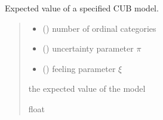 \documentclass[letterpaper,10pt,english]{sphinxmanual}
\begin{document}
\begin{fulllineitems}
\label{\detokenize{cubmods:cubmods.cub.mean}}
\pysigstartsignatures
{}
\pysigstopsignatures
\sphinxAtStartPar
Expected value of a specified CUB model.
\begin{quote}\begin{description}
\begin{itemize}
\item {} 
\sphinxAtStartPar
{} () \textendash{} number of ordinal categories

\item {} 
\sphinxAtStartPar
{} () \textendash{} uncertainty parameter \(\pi\)

\item {} 
\sphinxAtStartPar
{} () \textendash{} feeling parameter \(\xi\)

\end{itemize}

\sphinxAtStartPar
the expected value of the model

\sphinxAtStartPar
float

\end{description}\end{quote}

\end{fulllineitems}


\begin{fulllineitems}
\label{\detokenize{cubmods:cubmods.cub.mean_diff}}
\pysigstartsignatures
{}
\pysigstopsignatures
\end{fulllineitems}

\end{document}
